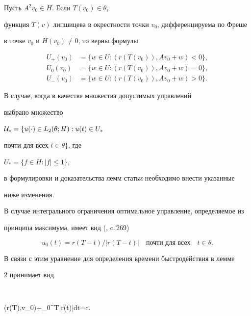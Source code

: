 \begin{thmnonum}


Пусть $A^2v_0\in H$. Если $T(v_0)\in\theta$,


функция $T(v)$ липшицева в окрестности точки $v_0$, дифференцируема по Фреше 


в точке $v_0$ и $H(v_0)\neq0$, то верны формулы


\begin{align*}


U_+(v_0)&=\{w\in U: (r(T(v_0)),Av_0+w)<0\},\\


U_0(v_0)&=\{w\in U: (r(T(v_0)),Av_0+w)=0\},\\


U_-(v_0)&=\{w\in U: (r(T(v_0)),Av_0+w)>0\}.


\end{align*}


\end{thmnonum}





\begin{notenonum}


В случае, когда в качестве множества допустимых управлений 


выбрано множество


${\cal U}_*=\{u(\cdot)\in L_2(\theta;H): u(t)\in U_*$


почти для всех $t\in\theta\}$, где


$U_*=\{f\in H: |f|\le1\}$,


в формулировки и доказательства лемм статьи необходимо внести указанные


ниже изменения.


\end{notenonum}





В случае интегрального ограничения оптимальное управление, определяемое из


принципа максимума, имеет вид (\cite{L}, c.\,269)


$$


u_0(t)=r(T-t)/|r(T-t)|\quad\text{почти для всех}\quad t\in\theta.


$$


В связи с этим уравнение для определения времени быстродействия в лемме


2 принимает вид


$$


(r(T),v_0)+\int_0^T|r(t)|dt=c.


